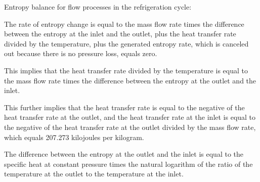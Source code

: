 Entropy balance for flow processes in the refrigeration cycle:

The rate of entropy change is equal to the mass flow rate times the difference between the entropy at the inlet and the outlet, plus the heat transfer rate divided by the temperature, plus the generated entropy rate, which is canceled out because there is no pressure loss, equals zero.

This implies that the heat transfer rate divided by the temperature is equal to the mass flow rate times the difference between the entropy at the outlet and the inlet.

This further implies that the heat transfer rate is equal to the negative of the heat transfer rate at the outlet, and the heat transfer rate at the inlet is equal to the negative of the heat transfer rate at the outlet divided by the mass flow rate, which equals 207.273 kilojoules per kilogram.

The difference between the entropy at the outlet and the inlet is equal to the specific heat at constant pressure times the natural logarithm of the ratio of the temperature at the outlet to the temperature at the inlet.